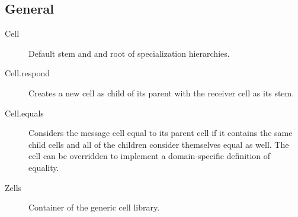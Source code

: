 \subsection{General}
\begin{description}
\item[Cell]{Default stem and and root of specialization hierarchies.}

\item[Cell.respond]{Creates a new cell  as child of its parent with the receiver cell as its stem.}

\item[Cell.equals]{Considers the message cell equal to its parent cell if it contains the same child cells and all of the children consider themselves equal as well. The cell can be overridden to implement a domain-specific definition of equality.}

\item[Zells]{Container of the generic cell library.}

\end{description}

